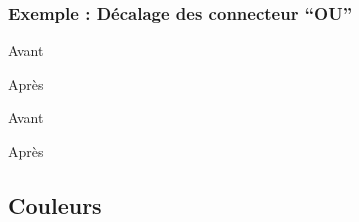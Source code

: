 	\subsubsection{Exemple : Décalage des connecteur ``OU''}\label{connecteursOU}


\begin{code}
\begin{fast}{Avant}
\end{fast}

\renewcommand*{\fastDecalageOuVertical}{3pt}	%
\renewcommand*{\fastDecalageOuHorizontal}{-3pt}	%
\begin{fast}{Après}
	\renewcommand{\fastDecalageOuVertical}{6pt}	%
	\renewcommand{\fastDecalageOuHorizontal}{-6pt}	%
\end{fast}
\fastReset
\end{code}
\cqd
\begin{exemple}
\begin{fast}{Avant}
\end{fast}
\renewcommand*{\fastDecalageOuVertical}{3pt}
\renewcommand*{\fastDecalageOuHorizontal}{-3pt}
\begin{fast}{Après}
	\renewcommand{\fastDecalageOuVertical}{6pt}
	\renewcommand{\fastDecalageOuHorizontal}{-6pt}
\end{fast}
\fastReset
\end{exemple}







	\subsection{Couleurs}\label{couleurs}

